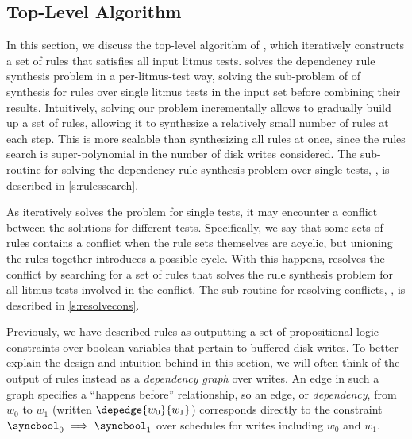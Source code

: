 \subsection{Top-Level Algorithm}
In this section, we discuss the top-level algorithm of \depsynth, which iteratively
constructs a set of rules that satisfies all input litmus tests. \depsynth solves the
dependency rule synthesis problem in a per-litmus-test way, solving the sub-problem of
of synthesis for rules over single litmus tests in the input set before combining their
results.
Intuitively, solving our problem incrementally allows \depsynth to gradually build
up a set of rules, allowing it to synthesize a relatively small number of
rules at each step.
This is more scalable than synthesizing all rules at once, since
the rules search is super-polynomial in the number of disk writes considered.
The sub-routine for solving the dependency rule synthesis problem over single tests,
, is described in \autoref{s:rulessearch}.


As \depsynth iteratively solves the problem for single tests, it may encounter a conflict
between the solutions for different tests.
Specifically, we say that some sets of rules contains a conflict when the rule sets
themselves are acyclic, but unioning the rules together introduces a possible cycle.
With this happens, \depsynth resolves the conflict
by searching for a set of rules that solves the rule synthesis problem for all litmus tests involved
in the conflict. The sub-routine for resolving conflicts, \resolvecons, is described in
\autoref{s:resolvecons}.

Previously, we have described rules as outputting a set of propositional logic constraints
over boolean variables that pertain to buffered disk writes.
To better explain the design and intuition behind \depsynth in this section,
we will often think of the output of rules instead as a \textit{dependency graph} over
writes. An edge in such a graph specifies a ``happens before'' relationship,
so an edge, or \textit{dependency}, from $w_0$ to $w_1$
(written $\depedge{w_0}{w_1}$) corresponds directly to
the constraint $\syncbool_0 \implies \syncbool_1$ over schedules for
writes including $w_0$ and $w_1$.


